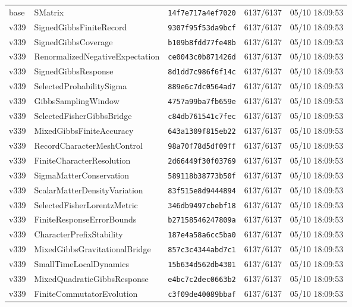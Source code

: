 \documentclass[11pt]{article}
\theoremstyle{definition}\newtheorem{deriv}{Derivation}
\begin{document}
{\begin{longtable}{@{}lllll@{}}
base & SMatrix & \texttt{14f7e717a4ef7020} & 6137/6137 & 05/10 18:09:53 \\
v339 & SignedGibbsFiniteRecord & \texttt{9307f95f53da9bcf} & 6137/6137 & 05/10 18:09:53 \\
v339 & SignedGibbsCoverage & \texttt{b109b8fdd77fe48b} & 6137/6137 & 05/10 18:09:53 \\
v339 & RenormalizedNegativeExpectation & \texttt{ce0043c0b871426d} & 6137/6137 & 05/10 18:09:53 \\
v339 & SignedGibbsResponse & \texttt{8d1dd7c986f6f14c} & 6137/6137 & 05/10 18:09:53 \\
v339 & SelectedProbabilitySigma & \texttt{889e6c7dc0564ad7} & 6137/6137 & 05/10 18:09:53 \\
v339 & GibbsSamplingWindow & \texttt{4757a99ba7fb659e} & 6137/6137 & 05/10 18:09:53 \\
v339 & SelectedFisherGibbsBridge & \texttt{c84db761541c7fec} & 6137/6137 & 05/10 18:09:53 \\
v339 & MixedGibbsFiniteAccuracy & \texttt{643a1309f815eb22} & 6137/6137 & 05/10 18:09:53 \\
v339 & RecordCharacterMeshControl & \texttt{98a70f78d5df09ff} & 6137/6137 & 05/10 18:09:53 \\
v339 & FiniteCharacterResolution & \texttt{2d66449f30f03769} & 6137/6137 & 05/10 18:09:53 \\
v339 & SigmaMatterConservation & \texttt{589118b38773b50f} & 6137/6137 & 05/10 18:09:53 \\
v339 & ScalarMatterDensityVariation & \texttt{83f515e8d9444894} & 6137/6137 & 05/10 18:09:53 \\
v339 & SelectedFisherLorentzMetric & \texttt{346db9497cbebf18} & 6137/6137 & 05/10 18:09:53 \\
v339 & FiniteResponseErrorBounds & \texttt{b27158546247809a} & 6137/6137 & 05/10 18:09:53 \\
v339 & CharacterPrefixStability & \texttt{187e4a58a6cc5ba0} & 6137/6137 & 05/10 18:09:53 \\
v339 & MixedGibbsGravitationalBridge & \texttt{857c3c4344abd7c1} & 6137/6137 & 05/10 18:09:53 \\
v339 & SmallTimeLocalDynamics & \texttt{15b634d562db4301} & 6137/6137 & 05/10 18:09:53 \\
v339 & MixedQuadraticGibbsResponse & \texttt{e4bc7c2dec0663b2} & 6137/6137 & 05/10 18:09:53 \\
v339 & FiniteCommutatorEvolution & \texttt{c3f09de40089bbaf} & 6137/6137 & 05/10 18:09:53 \\

\end{longtable}}
\end{document}
